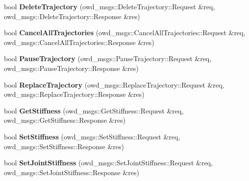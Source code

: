 \begin{DoxyCompactItemize}
\item 
\hypertarget{classOWD_1_1WamDriver_ab8afa3cb969edd69a3b2dab52f282a8c}{bool {\bfseries Delete\-Trajectory} (owd\-\_\-msgs\-::\-Delete\-Trajectory\-::\-Request \&req, owd\-\_\-msgs\-::\-Delete\-Trajectory\-::\-Response \&res)}\label{classOWD_1_1WamDriver_ab8afa3cb969edd69a3b2dab52f282a8c}

\item 
\hypertarget{classOWD_1_1WamDriver_ae0133b2ca189232bcc7db1bc2100ab3d}{bool {\bfseries Cancel\-All\-Trajectories} (owd\-\_\-msgs\-::\-Cancel\-All\-Trajectories\-::\-Request \&req, owd\-\_\-msgs\-::\-Cancel\-All\-Trajectories\-::\-Response \&res)}\label{classOWD_1_1WamDriver_ae0133b2ca189232bcc7db1bc2100ab3d}

\item 
\hypertarget{classOWD_1_1WamDriver_af684c63fa29f965c34c9181bf01bdbfb}{bool {\bfseries Pause\-Trajectory} (owd\-\_\-msgs\-::\-Pause\-Trajectory\-::\-Request \&req, owd\-\_\-msgs\-::\-Pause\-Trajectory\-::\-Response \&res)}\label{classOWD_1_1WamDriver_af684c63fa29f965c34c9181bf01bdbfb}

\item 
\hypertarget{classOWD_1_1WamDriver_a60531435102c2e0ee975a20c7b2146c3}{bool {\bfseries Replace\-Trajectory} (owd\-\_\-msgs\-::\-Replace\-Trajectory\-::\-Request \&req, owd\-\_\-msgs\-::\-Replace\-Trajectory\-::\-Response \&res)}\label{classOWD_1_1WamDriver_a60531435102c2e0ee975a20c7b2146c3}

\item 
\hypertarget{classOWD_1_1WamDriver_ac0fa645c84160dc9c41aa90565ac66ef}{bool {\bfseries Get\-Stiffness} (owd\-\_\-msgs\-::\-Get\-Stiffness\-::\-Request \&req, owd\-\_\-msgs\-::\-Get\-Stiffness\-::\-Response \&res)}\label{classOWD_1_1WamDriver_ac0fa645c84160dc9c41aa90565ac66ef}

\item 
\hypertarget{classOWD_1_1WamDriver_ab8c10f7d71b5c3304d91f5779befdf9c}{bool {\bfseries Set\-Stiffness} (owd\-\_\-msgs\-::\-Set\-Stiffness\-::\-Request \&req, owd\-\_\-msgs\-::\-Set\-Stiffness\-::\-Response \&res)}\label{classOWD_1_1WamDriver_ab8c10f7d71b5c3304d91f5779befdf9c}

\item 
\hypertarget{classOWD_1_1WamDriver_a21cd219a04b34648925088bb932daa12}{bool {\bfseries Set\-Joint\-Stiffness} (owd\-\_\-msgs\-::\-Set\-Joint\-Stiffness\-::\-Request \&req, owd\-\_\-msgs\-::\-Set\-Joint\-Stiffness\-::\-Response \&res)}\label{classOWD_1_1WamDriver_a21cd219a04b34648925088bb932daa12}


\end{DoxyCompactItemize}
